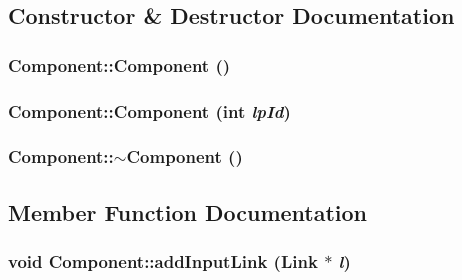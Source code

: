 \subsection{Constructor \& Destructor Documentation}
\hypertarget{classComponent_8775db6d1a2c1afc2e77cd3c8f39da6f}{
\subsubsection[{Component}]{\setlength{\rightskip}{0pt plus 5cm}Component::Component ()}}
\label{classComponent_8775db6d1a2c1afc2e77cd3c8f39da6f}


\hypertarget{classComponent_52f5a349d8ed4bd7efd4c8ee381a0ed8}{
\subsubsection[{Component}]{\setlength{\rightskip}{0pt plus 5cm}Component::Component (int {\em lpId})}}
\label{classComponent_52f5a349d8ed4bd7efd4c8ee381a0ed8}


\hypertarget{classComponent_b8378fa275af98e568a7e91d33d867af}{
\subsubsection[{$\sim$Component}]{\setlength{\rightskip}{0pt plus 5cm}Component::$\sim$Component ()}}
\label{classComponent_b8378fa275af98e568a7e91d33d867af}




\subsection{Member Function Documentation}
\hypertarget{classComponent_9c7c91fe01f0d204cbc79b597d8236fe}{
\subsubsection[{addInputLink}]{\setlength{\rightskip}{0pt plus 5cm}void Component::addInputLink ({\bf Link} $\ast$ {\em l})}}
\label{classComponent_9c7c91fe01f0d204cbc79b597d8236fe}


